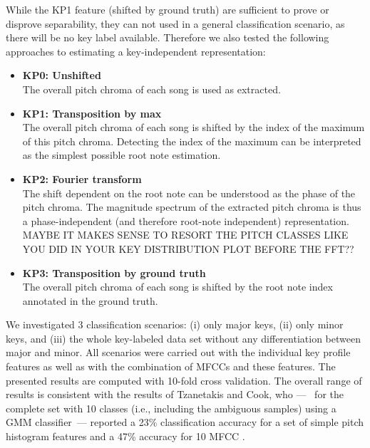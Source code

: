 \documentclass{article}
\begin{document}
While the KP1 feature (shifted by ground truth) are sufficient to prove or disprove separability, they can not used in a general classification scenario, as there will be no key label available. Therefore we also tested the following approaches to estimating a key-independent representation:
\begin{itemize}
    \item   \textbf{KP0: Unshifted}\\
        The overall pitch chroma of each song is used as extracted.
    \item   \textbf{KP1: Transposition by max}\\
        The overall pitch chroma of each song is shifted by the index of the maximum of this pitch chroma. Detecting the index of the maximum can be interpreted as the simplest possible root note estimation.
    \item   \textbf{KP2: Fourier transform}\\
        The shift dependent on the root note can be understood as the phase of the pitch chroma. The magnitude spectrum of the extracted pitch chroma is thus a phase-independent (and therefore root-note independent) representation. MAYBE IT MAKES SENSE TO RESORT THE PITCH CLASSES LIKE YOU DID IN YOUR KEY DISTRIBUTION PLOT BEFORE THE FFT?? %
    \item   \textbf{KP3: Transposition by ground truth}\\
        The overall pitch chroma of each song is shifted by the root note index annotated in the ground truth.
\end{itemize}

We investigated 3 classification scenarios: (i) only major keys, (ii) only minor keys, and (iii) the whole key-labeled data set without any differentiation between major and minor. All scenarios were carried out with the individual key profile features as well as with the combination of MFCCs and these features. The presented results are computed with 10-fold cross validation.
The overall range of results is consistent with the results of Tzanetakis and Cook, who ---~ for the complete set with 10 classes (i.e., including the ambiguous samples) using a GMM classifier~--- reported a 23\% classification accuracy for a set of simple pitch histogram features and a 47\% accuracy for 10 MFCC \cite{tzanetakis_musical_2002}. 
\end{document}
